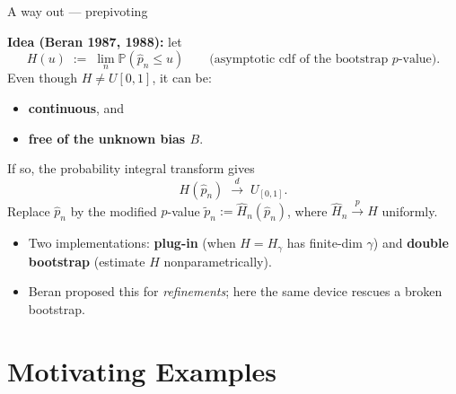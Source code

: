 \documentclass[10pt,aspectratio=169]{beamer}
\theoremstyle{plain}
\newcommand{\PR}{\mathbb{P}}
\newcommand{\dto}{\xrightarrow{d}}
\newcommand{\pto}{\xrightarrow{p}}
\newcommand{\pnh}{\hat{p}_{n}}
\newcommand{\pnt}{\tilde{p}_{n}}
\newcommand{\Hnh}{\hat{H}_{n}}
\begin{document}
\begin{frame}{A way out --- prepivoting}

  \textbf{Idea (Beran 1987, 1988):} let
  \[
    H(u) \;:=\; \lim_{n} \PR(\pnh \le u)
    \qquad\text{(asymptotic cdf of the bootstrap $p$-value).}
  \]
  Even though $H \neq U[0,1]$, it can be:
  \begin{itemize}
    \setlength{\itemsep}{4pt}
    \item \textbf{continuous}, and
    \item \textbf{free of the unknown bias $B$}.
  \end{itemize}

  \medskip

  If so, the probability integral transform gives
  \[
    H(\pnh) \;\dto\; U_{[0,1]}.
  \]
  Replace $\pnh$ by the modified $p$-value $\pnt := \Hnh(\pnh)$, where
  $\Hnh \pto H$ uniformly.

  \medskip

  \begin{itemize}
    \setlength{\itemsep}{4pt}
    \item Two implementations: \textbf{plug-in} (when $H = H_\gamma$ has finite-dim $\gamma$)
      and \textbf{double bootstrap} (estimate $H$ nonparametrically).
    \item Beran proposed this for \textit{refinements}; here the same device
      \alert{rescues a broken bootstrap}.
  \end{itemize}

\end{frame}
\section{Motivating Examples}
\end{document}
